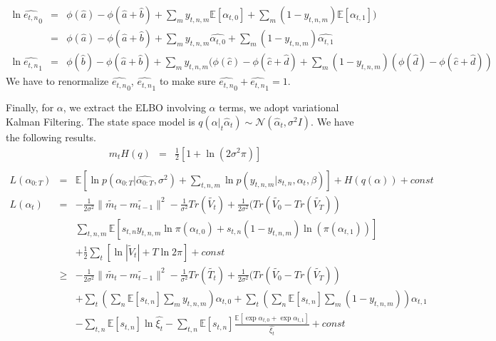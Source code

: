\documentclass[11pt]{report}
\newcommand{\Ep}{\mathbb{E}}
\newcommand{\Gaussian}{\mathcal{N}}
\begin{document}
\begin{eqnarray}
\ln \hat{e_{t,n}}_0 & = &\phi(\hat{a})-\phi(\hat{a}+\hat{b}) + \sum_{m}  y_{t,n,m}   \Ep[\alpha_{t,0}] +\sum_m (1-y_{t,n,m}) \Ep[\alpha_{t,1}])   \\\nonumber
&=&\phi(\hat{a})-\phi(\hat{a}+\hat{b}) + \sum_{m}  y_{t,n,m}   \hat{\alpha_{t,0}} +\sum_m (1-y_{t,n,m}) \hat{\alpha_{t,1}} \\\nonumber 
\ln \hat{e_{t,n}}_1 & = &\phi(\hat{b})-\phi(\hat{a}+\hat{b}) + \sum_{m}  y_{t,n,m} (\phi(\hat{c})-\phi(\hat{c}+\hat{d}) +\sum_m (1-y_{t,n,m}) (\phi(\hat{d})-\phi(\hat{c}+\hat{d})) 
\end{eqnarray}
We have to renormalize $\hat{e_{t,n}}_0$, $\hat{e_{t,n}}_1$ to make sure $\hat{e_{t,n}}_0+\hat{e_{t,n}}_1=1$.

Finally, for $\alpha$, we extract the ELBO involving $\alpha$ terms, we adopt variational Kalman Filtering. The state space model is $q(\alpha|_t\hat{\alpha}_{t})\sim \Gaussian(\hat{\alpha}_t,\sigma^2I)$. We have the following results.
\begin{eqnarray*}
m_t
H(q) &= & \frac{1}{2} [1+\ln (2\sigma^2 \pi)] \\\nonumber
\end{eqnarray*}
\begin{eqnarray*}
L(\alpha_{0:T}) & = & \Ep[\ln p(\alpha_{0:T}|\hat{\alpha_{0:T}},\sigma^2) + \sum_{t,n,m}  \ln p(y_{t,n,m}|s_{t,n},\alpha_t,\beta) ] + H(q(\alpha)) + const \\\nonumber
L(\alpha_t) & = & -\frac{1}{2\sigma^2} \|\tilde{m_t}-\tilde{m_{t-1}}\|^2 - \frac{1}{\sigma^2} Tr(\tilde {V_t}) + \frac{1}{2\sigma^2} (Tr(\tilde{V_0} - Tr(\tilde{V_T})) \\\nonumber
& & \sum_{t,n,m} \Ep [s_{t,n} y_{t,n,m} \ln \pi(\alpha_{t,0}) + s_{t,n}(1-y_{t,n,m}) \ln (\pi(\alpha_{t,1}))]  \\\nonumber
& & + \frac{1}{2} \sum_t [\ln |\tilde{V}_t| + T\ln 2\pi] + const \\\nonumber
& \geq & -\frac{1}{2\sigma^2} \|\tilde{m_t}-\tilde{m_{t-1}}\|^2 - \frac{1}{\sigma^2} Tr(\tilde {T_t}) + \frac{1}{2\sigma^2} (Tr(\tilde{V_0} - Tr(\tilde{V_T})) \\\nonumber
& & + \sum_t(\sum_n \Ep[s_{t,n}] \sum_m y_{t,n,m}) \alpha_{t,0} + \sum_t(\sum_n \Ep[s_{t,n}] \sum_m (1-y_{t,n,m})) \alpha_{t,1}\\\nonumber
& & - \sum_{t,n} \Ep[s_{t,n}] \ln \hat{\xi_t}  -  \sum_{t,n} \Ep[s_{t,n}] \frac{\Ep[\exp \alpha_{t,0} + \exp \alpha_{t,1} ]}{\hat{\xi_t}}  + const
\end{eqnarray*}
\end{document}
